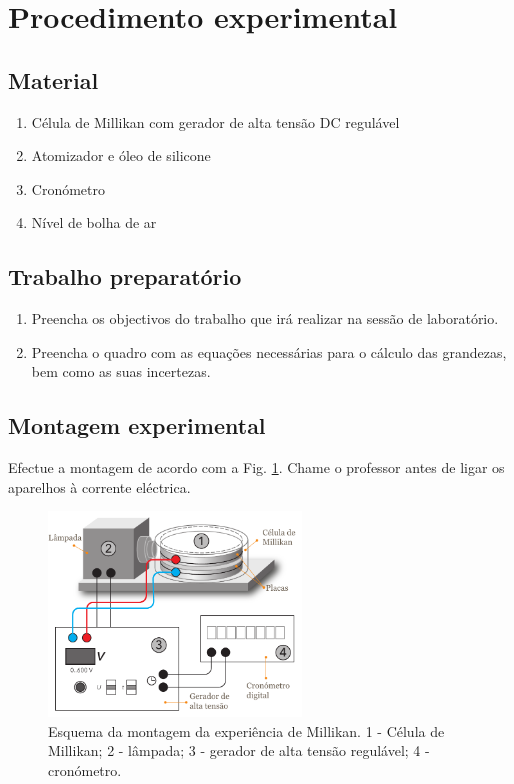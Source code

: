 \documentclass[a4paper,twoside,11pt]{report}      %
\begin{document}
\newpage
\section{\sf Procedimento experimental}


\subsection{\sf Material}

\begin{enumerate}
	\item Célula de Millikan com gerador de alta tensão DC regulável
	\item  Atomizador e óleo de silicone
	\item Cronómetro
	\item Nível de bolha de ar%
\end{enumerate}


\subsection{\sf Trabalho preparatório} 
\begin{enumerate}
\item Preencha os objectivos do trabalho que irá realizar na sessão de laboratório. 
\item Preencha o quadro com as equações necessárias para o cálculo das grandezas, bem como as suas incertezas. 
\end{enumerate}

\subsection{\sf Montagem experimental}
Efectue a montagem de acordo com a Fig. \ref{fig:esquema-millikan}. Chame o professor antes de ligar os aparelhos à corrente eléctrica.

\begin{figure}
	[htb]  \centering 
	\includegraphics[width=0.6\textwidth]{Esquema-Millikan.pdf}
	\caption{Esquema da montagem da experiência de Millikan. 1 - Célula de Millikan; 2 - lâmpada; 3 - gerador de alta tensão regulável; 4 - cronómetro.\label{fig:esquema-millikan}} 
\end{figure}
\end{document}
